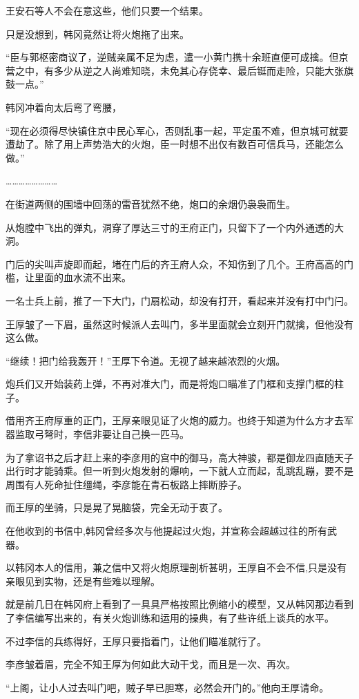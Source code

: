 王安石等人不会在意这些，他们只要一个结果。

只是没想到，韩冈竟然让将火炮拖了出来。

“臣与郭枢密商议了，逆贼亲属不足为虑，遣一小黄门携十余班直便可成擒。但京营之中，有多少从逆之人尚难知晓，未免其心存侥幸、最后铤而走险，只能大张旗鼓一点。”

韩冈冲着向太后弯了弯腰，

“现在必须得尽快镇住京中民心军心，否则乱事一起，平定虽不难，但京城可就要遭劫了。除了用上声势浩大的火炮，臣一时想不出仅有数百可信兵马，还能怎么做。”

……………………

在街道两侧的围墙中回荡的雷音犹然不绝，炮口的余烟仍袅袅而生。

从炮膛中飞出的弹丸，洞穿了厚达三寸的王府正门，只留下了一个内外通透的大洞。

门后的尖叫声旋即而起，堵在门后的齐王府人众，不知伤到了几个。王府高高的门槛，让里面的血水流不出来。

一名士兵上前，推了一下大门，门扇松动，却没有打开，看起来并没有打中门闩。

王厚皱了一下眉，虽然这时候派人去叫门，多半里面就会立刻开门就擒，但他没有这么做。

“继续！把门给我轰开！”王厚下令道。无视了越来越浓烈的火烟。

炮兵们又开始装药上弹，不再对准大门，而是将炮口瞄准了门框和支撑门框的柱子。

借用齐王府厚重的正门，王厚亲眼见证了火炮的威力。也终于知道为什么方才去军器监取弓弩时，李信非要让自己换一匹马。

为了拿诏书之后才赶上来的李彦用的宫中的御马，高大神骏，都是御龙四直随天子出行时才能骑乘。但一听到火炮发射的爆响，一下就人立而起，乱跳乱蹦，要不是周围有人死命扯住缰绳，李彦能在青石板路上摔断脖子。

而王厚的坐骑，只是晃了晃脑袋，完全无动于衷了。

在他收到的书信中,韩冈曾经多次与他提起过火炮，并宣称会超越过往的所有武器。

以韩冈本人的信用，兼之信中又将火炮原理剖析甚明，王厚自不会不信,只是没有亲眼见到实物，还是有些难以理解。

就是前几日在韩冈府上看到了一具具严格按照比例缩小的模型，又从韩冈那边看到了李信编写出来的，有关火炮训练和运用的操典，有了些许纸上谈兵的水平。

不过李信的兵练得好，王厚只要指着门，让他们瞄准就行了。

李彦皱着眉，完全不知王厚为何如此大动干戈，而且是一次、再次。

“上阁，让小人过去叫门吧，贼子早已胆寒，必然会开门的。”他向王厚请命。

